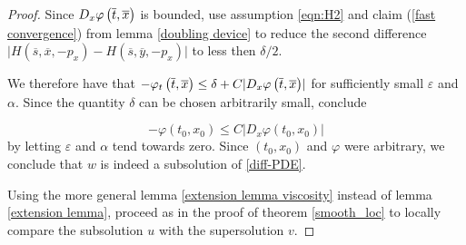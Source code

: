 \begin{theorem}
\begin{proof}
		  		Since $ D_x \varphi\left(\overline{t}, \overline{x}\right) $ is bounded, use assumption \eqref{eqn:H2} and claim (\ref{fast convergence}) from lemma \ref{doubling device} to reduce the second difference $ \lvert H(\overline{s}, \overline{x}, -p_x) - H(\overline{s}, \overline{y}, -p_x) \rvert $ to less then $ \delta / 2 $.
		  		
		  		We therefore have that $ -\varphi_t\left(\overline{t}, \overline{x}\right) \leq \delta + C \lvert D_x \varphi\left(\overline{t}, \overline{x}\right) \rvert $ for sufficiently small $ \varepsilon $ and $ \alpha $. Since the quantity $ \delta $ can be chosen arbitrarily small, conclude 
		  		
		  		\begin{equation*}
		  			- \varphi(t_0, x_0) \leq C \lvert D_x \varphi(t_0, x_0) \rvert
		  		\end{equation*}
		  		by letting $ \varepsilon $ and $ \alpha $ tend towards zero. Since $ (t_0, x_0) $ and $ \varphi $ were arbitrary, we conclude that $ w $ is indeed a subsolution of \eqref{diff-PDE}.
		  		
		  		Using the more general lemma \ref{extension lemma viscosity} instead of lemma \ref{extension lemma}, proceed as in the proof of theorem \ref{smooth_loc} to locally compare the subsolution $ u $ with the supersolution $ v $.
		  	\end{proof}
		  \end{theorem}
